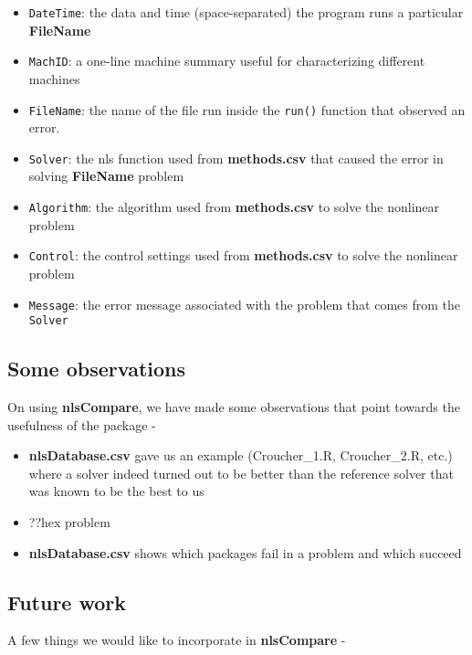 \begin{itemize}
\tightlist
\item
  \texttt{DateTime}: the data and time (space-separated) the program
  runs a particular \textbf{FileName}
\item
  \texttt{MachID}: a one-line machine summary useful for characterizing
  different machines
\item
  \texttt{FileName}: the name of the file run inside the \texttt{run()}
  function that observed an error.
\item
  \texttt{Solver}: the nls function used from \textbf{methods.csv} that
  caused the error in solving \textbf{FileName} problem
\item
  \texttt{Algorithm}: the algorithm used from \textbf{methods.csv} to
  solve the nonlinear problem
\item
  \texttt{Control}: the control settings used from \textbf{methods.csv}
  to solve the nonlinear problem
\item
  \texttt{Message}: the error message associated with the problem that
  comes from the \texttt{Solver}
\end{itemize}

\hypertarget{some-observations}{%
\subsection{Some observations}\label{some-observations}}

On using \textbf{nlsCompare}, we have made some observations that point
towards the usefulness of the package -

\begin{itemize}
\tightlist
\item
  \textbf{nlsDatabase.csv} gave us an example (Croucher\_1.R,
  Croucher\_2.R, etc.) where a solver indeed turned out to be better
  than the reference solver that was known to be the best to us
\item
  ??hex problem
\item
  \textbf{nlsDatabase.csv} shows which packages fail in a problem and
  which succeed
\end{itemize}

\hypertarget{future-work}{%
\subsection{Future work}\label{future-work}}

A few things we would like to incorporate in \textbf{nlsCompare} -

